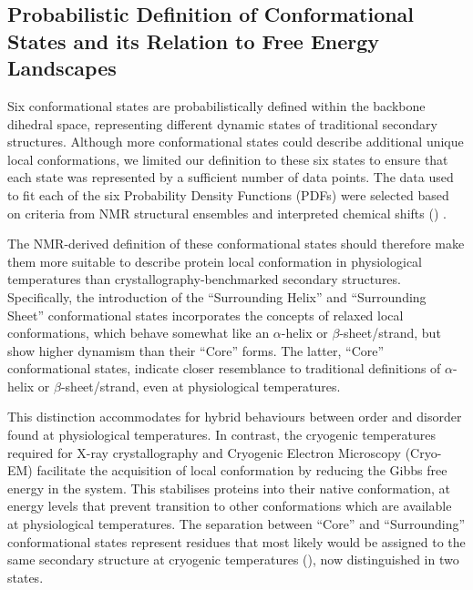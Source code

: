 \subsection{Probabilistic Definition of Conformational States and its Relation to Free Energy Landscapes}

Six conformational states are probabilistically defined within the backbone dihedral space, representing different dynamic states of traditional secondary structures. Although more conformational states could describe additional unique local conformations, we limited our definition to these six states to ensure that each state was represented by a sufficient number of data points. The data used to fit each of the six Probability Density Functions (PDFs) were selected based on criteria from NMR structural ensembles and interpreted chemical shifts () \cite{orlando_shiftcrypt_2020}. 

The NMR-derived definition of these conformational states should therefore make them more suitable to describe protein local conformation in physiological temperatures than crystallography-benchmarked secondary structures. Specifically, the introduction of the ``Surrounding Helix'' and ``Surrounding Sheet'' conformational states incorporates the concepts of relaxed local conformations, which behave somewhat like an $\alpha$-helix or $\beta$-sheet/strand, but show higher dynamism than their ``Core'' forms. The latter, ``Core'' conformational states, indicate closer resemblance to traditional definitions of $\alpha$-helix or $\beta$-sheet/strand, even at physiological temperatures. 

This distinction accommodates for hybrid behaviours between order and disorder found at physiological temperatures. In contrast, the cryogenic temperatures required for X-ray crystallography and Cryogenic Electron Microscopy (Cryo-EM) facilitate the acquisition of local conformation by reducing the Gibbs free energy in the system. This stabilises proteins into their native conformation, at energy levels that prevent transition to other conformations which are available at physiological temperatures. The separation between ``Core'' and ``Surrounding'' conformational states represent residues that most likely would be assigned to the same secondary structure at cryogenic temperatures (), now distinguished in two states. 

